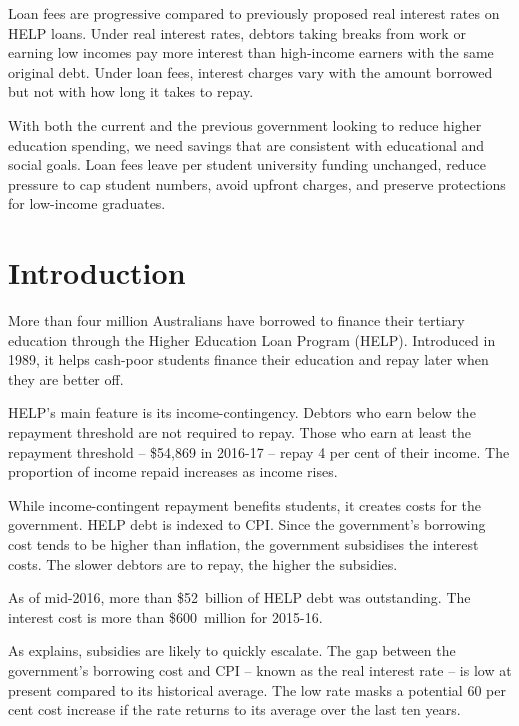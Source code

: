 \documentclass[embargoed]{grattan}
\begin{document}
\begin{overview}
Loan fees are progressive compared to previously proposed real interest rates on \gls{HELP} loans.
Under real interest rates, debtors taking breaks from work or earning low incomes pay more interest than high-income earners with the same original debt.
Under loan fees, interest charges vary with the amount borrowed but not with how long it takes to repay.

With both the current and the previous government looking to reduce higher education spending, we need savings that are consistent with educational and social goals.
Loan fees leave per student university funding unchanged, reduce pressure to cap student numbers, avoid upfront charges, and preserve protections for low-income graduates.
\end{overview}

\contentspage



\chapter{{Introduction}}\label{chap:1-introduction}

More than four million Australians have borrowed to finance their tertiary education through the Higher Education Loan Program (HELP).
Introduced in 1989, it helps cash-poor students finance their education and repay later when they are better off.

\gls{HELP}'s main feature is its income-contingency.
Debtors who earn below the repayment threshold are not required to repay.
Those who earn at least the repayment threshold -- \$54,869 in 2016-17 -- repay 4 per cent of their income.
The proportion of income repaid increases as income rises.

While income-contingent repayment benefits students, it creates costs for the government.
\gls{HELP} debt is indexed to \gls{CPI}.
Since the government's borrowing cost tends to be higher than inflation, the government subsidises the interest costs.
The slower debtors are to repay, the higher the subsidies.

As of mid-2016, more than \$52~billion of \gls{HELP} debt was outstanding.
The interest cost is more than \$600~million for 2015-16.

As  explains, subsidies are likely to quickly escalate.
The gap between the government's borrowing cost and \gls{CPI} -- known as the real interest rate -- is low at present compared to its historical average.
The low rate masks a potential 60 per cent cost increase if the rate returns to its average over the last ten years.
\end{document}

